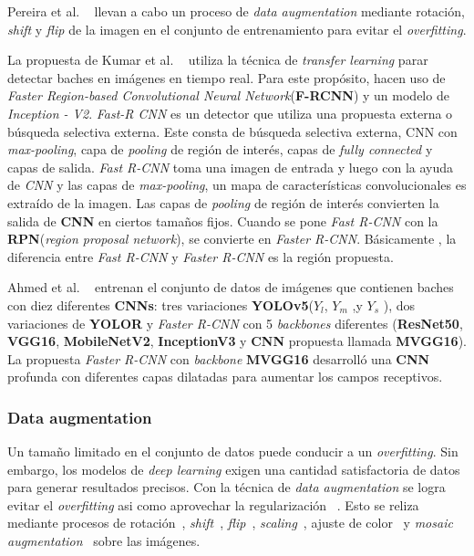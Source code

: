
	Pereira et al. ~ llevan a cabo un proceso de \emph{data augmentation} mediante rotación, \emph{shift} y \emph{flip}
	de la imagen en el conjunto de entrenamiento para evitar el \emph{overfitting}.

	La propuesta de Kumar et al. ~ utiliza la técnica de \emph{transfer learning} parar detectar baches en imágenes 
	en tiempo real. Para este propósito, hacen uso de \emph{Faster Region-based Convolutional Neural Network}(\textbf{F-RCNN}) y un modelo de
	\emph{Inception - V2}. \emph{Fast-R CNN} es un detector que utiliza una propuesta externa 
	o búsqueda selectiva externa. Este consta de  búsqueda selectiva externa, CNN con \emph{max-pooling}, capa de \emph{pooling} de 
	región de interés, capas de \emph{fully connected} y capas de salida. \emph{Fast R-CNN} toma una imagen de entrada y luego con  la 
	ayuda de \emph{CNN} y las capas de \emph{max-pooling}, un mapa de características convolucionales es extraído de la imagen. Las 
	capas de \emph{pooling} de región de interés convierten la salida de \textbf{CNN} en ciertos tamaños fijos. Cuando se pone 
	\emph{Fast R-CNN} con la \textbf{RPN}(\emph{region proposal network}), se convierte en \emph{Faster R-CNN}. Básicamente , la 
	diferencia entre \emph{Fast R-CNN} y \emph{Faster R-CNN} es la región propuesta.

	Ahmed et al. ~ entrenan el conjunto de datos de imágenes que contienen baches con diez diferentes 
	\textbf{CNNs}: tres variaciones  \textbf{YOLOv5}($Y_l$, $Y_m$ ,y $Y_s$ ), dos variaciones de \textbf{YOLOR} y \emph{Faster R-CNN} 
	con 5 \emph{backbones} diferentes (\textbf{ResNet50}, \textbf{VGG16}, \textbf{MobileNetV2}, \textbf{InceptionV3}  y  \textbf{CNN} 
	propuesta llamada  \textbf{MVGG16}). La propuesta \emph{Faster R-CNN} con \emph{backbone} \textbf{MVGG16} desarrolló una 
	\textbf{CNN} profunda con diferentes capas dilatadas para aumentar los campos receptivos.

		\subsubsection{Data augmentation}
			Un tamaño limitado en el conjunto de datos puede conducir a un \emph{overfitting}. Sin embargo, los modelos de \emph{deep learning}
			exigen una cantidad satisfactoria de datos para generar resultados precisos. Con la técnica de \emph{data augmentation} se logra evitar 
			el \emph{overfitting} asi como aprovechar la regularización ~. 
			Esto se reliza mediante procesos de rotación~, \emph{shift}~, 
			\emph{flip}~, \emph{scaling}~, ajuste de color~ y 
			\emph{mosaic augmentation}~ sobre las imágenes.

